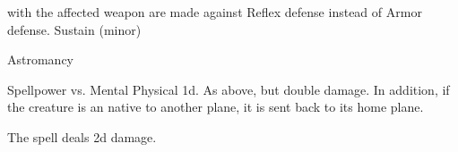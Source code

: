 \begin{spellcontent}
\begin{augmenttargetinginfo}
\end{augmenttargetinginfo}
\begin{augmenteffects}
\spelleffect
{} with the affected weapon are made against Reflex defense instead of Armor defense.
\spelldur Sustain (minor)
\end{augmenteffects}
\end{spellcontent}
\begin{spellsection}{Astromancy}
\begin{spellheader}
\end{spellheader}
\begin{spellcontent}
\begin{spelltargetinginfo}
\end{spelltargetinginfo}
\begin{spelleffects}
\begin{spellattack}{Spellpower vs. Mental}
\spellsuccess Physical  \plus1d.
\spellcritical
As above, but double damage.
In addition, if the creature is an  native to another plane, it is sent back to its home plane.
\end{spellattack}
\end{spelleffects}
\end{spellcontent}
\begin{spellfooter}
\end{spellfooter}
\begin{spellsubcontent}
\begin{spellcantrip}
The spell deals \minus2d damage.
\end{spellcantrip}
\end{spellsubcontent}
\end{spellsection}
